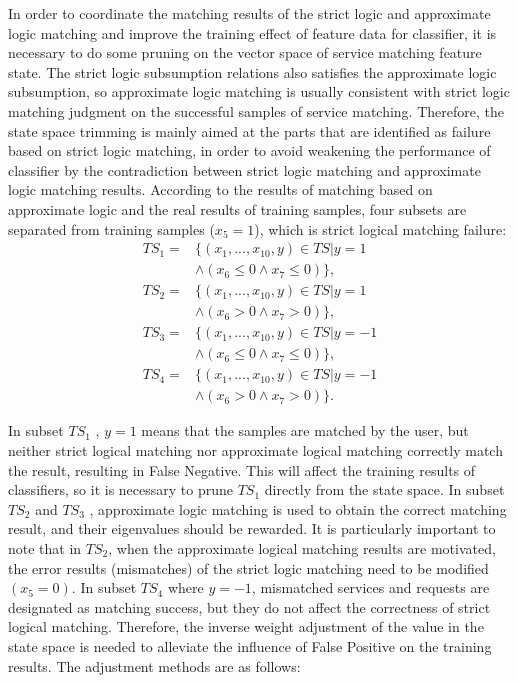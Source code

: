 \documentclass{ieeeaccess}
\begin{document}
In order to coordinate the matching results of the strict logic and approximate logic matching and improve the training effect of feature data for classifier, it is necessary to do some pruning on the vector space of service matching feature state. The strict logic subsumption relations also satisfies the approximate logic subsumption, so approximate logic matching is usually consistent with strict logic matching judgment on the successful samples of service matching. Therefore, the state space trimming is mainly aimed at the parts that are identified as failure based on strict logic matching, in order to avoid weakening the performance of classifier by the contradiction between strict logic matching and approximate logic matching results. According to the results of matching based on approximate logic and the real results of training samples, four subsets are separated from training samples ($x_{5}=1$), which is strict logical matching failure:
\begin{align}
TS_{1}=&\{({{x}_{1}},...,{{x}_{10}},y )\in TS| y=1\nonumber\\
&\wedge ( {{x}_{6}}\le 0\wedge {{x}_{7}}\le 0 )\},\nonumber\\
TS_{2}=&\{({{x}_{1}},...,{{x}_{10}},y )\in TS| y=1\nonumber\\
&\wedge ( {{x}_{6}}> 0\wedge {{x}_{7}}> 0 )\},\nonumber\\
TS_{3}=&\{({{x}_{1}},...,{{x}_{10}},y )\in TS| y=-1\nonumber\\
&\wedge ( {{x}_{6}}\le 0\wedge {{x}_{7}}\le 0 )\},\nonumber\\
TS_{4}=&\{({{x}_{1}},...,{{x}_{10}},y )\in TS| y=-1\nonumber\\
&\wedge ( {{x}_{6}}> 0\wedge {{x}_{7}}> 0 )\}.
\end{align}

In subset $TS_{1}$ , $y=1$ means that the samples are matched by the user, but neither strict logical matching nor approximate logical matching correctly match the result, resulting in False Negative. This will affect the training results of classifiers, so it is necessary to prune $TS_{1}$ directly from the state space. In subset $TS_{2}$ and $TS_{3}$ , approximate logic matching is used to obtain the correct matching result, and their eigenvalues should be rewarded. It is particularly important to note that in $TS_{2}$, when the approximate logical matching results are motivated, the error results (mismatches) of the strict logic matching need to be modified $(x_{5}=0)$. In subset $TS_{4}$ where $y=-1$, mismatched services and requests are designated as matching success, but they do not affect the correctness of strict logical matching. Therefore, the inverse weight adjustment of the value in the state space is needed to alleviate the influence of False Positive on the training results. The adjustment methods are as follows:
\end{document}
